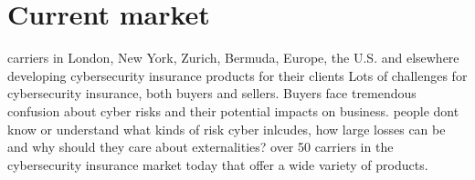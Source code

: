 \chapter{Current market}
\label{chp:hvahardenneaasi??} 
carriers in London, New York, Zurich, Bermuda, Europe, the U.S. and 
elsewhere developing cybersecurity insurance products for their clients
Lots of challenges for cybersecurity insurance, both buyers and sellers. 
Buyers face tremendous confusion about cyber risks and their potential impacts on business. 
people dont know or understand what kinds of risk cyber inlcudes, 
how large losses can be and why should they care about externalities?
over 50 carriers in the cybersecurity insurance market today that offer a wide variety of products.
\cite{Nobody06}
